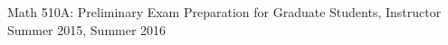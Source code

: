 \documentclass[12pt]{article}
\newcommand{\sectionheading}[1]
{
\bigskip %
\noindent
\hspace{-6.5mm}\textcolor{Gray}{\rule[.75mm]{21.5mm}{1mm}} %
\hspace{.2mm}	%
{\large{\textbf{\textsc{#1}}}} %
}
\newenvironment{date_section}
	{
	\vspace{-1ex}
	\leftmargini = 15ex
		\begin{itemize}[
			labelsep = *,
			labelwidth = 9ex,
			labelindent = 0ex,
			itemindent = !,
			font=\normalfont,
			align=parleft
		]{}
		\itemsep=-1.5mm
	}
	{\end{itemize}\vspace{-2ex}}
\newcommand{\yearmo}[2]{
	\item[
		{\makebox[1ex][r]{#1}}
		\hspace{1ex}
		{\makebox[1ex][l]{#2} }
		] }
\begin{document}
\begin{date_section}
		\yearmo{}{} Math 510A: Preliminary Exam Preparation for Graduate Students, Instructor
		\\
		Summer 2015, Summer 2016



	\end{date_section}






%
%
%
%
%
%
%
%
%
\end{document}
